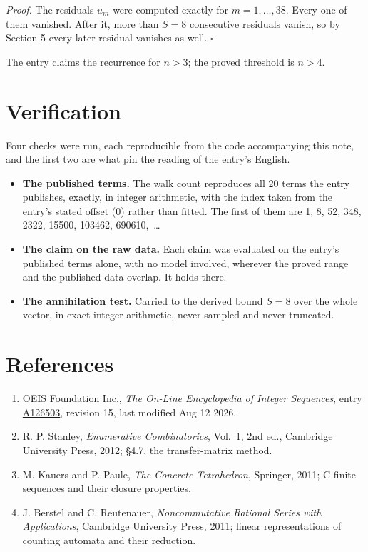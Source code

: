 \documentclass[11pt]{article}
\theoremstyle{definition}
\begin{document}
{\itshape Proof.} The residuals $u_m$ were computed exactly for $m = 1,\dots,38$. Every one of them vanished. After it, more than $S = 8$ consecutive residuals vanish, so by Section 5 every later residual vanishes as well. $\square$

The entry claims the recurrence for $n > 3$; the proved threshold is $n > 4$.

\section{Verification}

Four checks were run, each reproducible from the code accompanying this note, and the first two are what pin the reading of the entry's English.

\begin{itemize}

\item {\bfseries The published terms.} The walk count reproduces all 20 terms the entry publishes, exactly, in integer arithmetic, with the index taken from the entry's stated offset (0) rather than fitted. The first of them are 1, 8, 52, 348, 2322, 15500, 103462, 690610,~\dots

\item {\bfseries The claim on the raw data.} Each claim was evaluated on the entry's published terms alone, with no model involved, wherever the proved range and the published data overlap. It holds there.

\item {\bfseries The annihilation test.} Carried to the derived bound $S = 8$ over the whole vector, in exact integer arithmetic, never sampled and never truncated.

\end{itemize}

\section{References}

\begin{enumerate}

\item OEIS Foundation Inc., \emph{The On-Line Encyclopedia of Integer Sequences}, entry \href{https://oeis.org/A126503}{A126503}, revision 15, last modified Aug 12 2026.

\item R. P. Stanley, \emph{Enumerative Combinatorics}, Vol.~1, 2nd ed., Cambridge University Press, 2012; \S4.7, the transfer-matrix method.

\item M. Kauers and P. Paule, \emph{The Concrete Tetrahedron}, Springer, 2011; C-finite sequences and their closure properties.

\item J. Berstel and C. Reutenauer, \emph{Noncommutative Rational Series with Applications}, Cambridge University Press, 2011; linear representations of counting automata and their reduction.

\end{enumerate}
\end{document}
